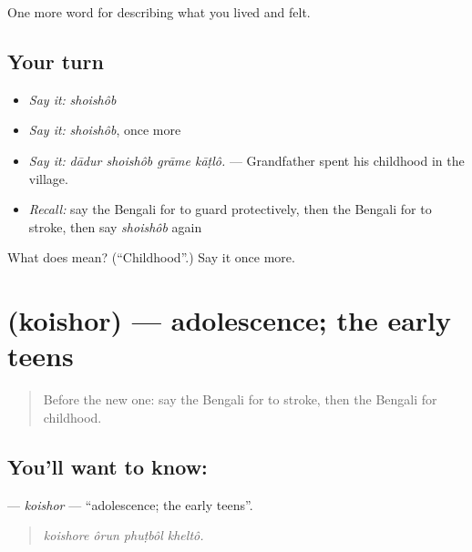 \begin{grammarlens}[title={What you've built}]
One more word for describing what you lived and felt.
\end{grammarlens}

\subsection*{Your turn}
\begin{itemize}
\raggedright
  \item \emph{Say it:} \emph{shoishôb}
  \item \emph{Say it:} \emph{shoishôb}, once more
  \item \emph{Say it:} \emph{dādur shoishôb grāme kāṭlô.} — Grandfather spent his childhood in the village.
  \item \emph{Recall:} say the Bengali for to guard protectively, then the Bengali for to stroke, then say \emph{shoishôb} again
\end{itemize}

\begin{tcolorbox}[breakable,colback=teal!4,colframe=teal!35!black,title={Before you move on}]
What does  mean? (\textquotedblleft{}Childhood\textquotedblright{}.) Say it once more.
\end{tcolorbox}
\section[\texorpdfstring{\bn{কৈশোর} (koishor)}{কৈশোর (koishor)}]{ (koishor) — adolescence; the early teens}

\label{lesson:BN-C488-koishor}



\begin{quote}
Before the new one: say the Bengali for to stroke, then the Bengali for childhood.
\end{quote}

\subsection*{You'll want to know: }
\textbf{} — \emph{koishor} — \textquotedblleft{}adolescence; the early teens\textquotedblright{}.

\begin{quote}
   
\end{quote}

\begin{quote}
\emph{koishore ôrun phuṭbôl kheltô.}
\end{quote}

